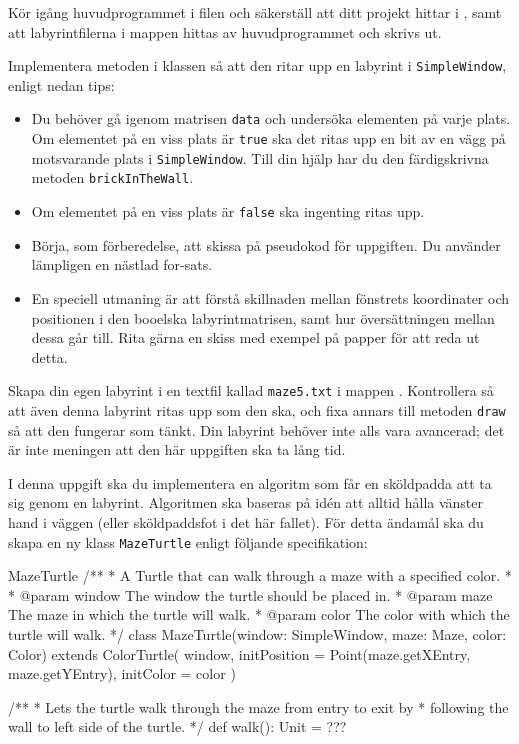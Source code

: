 \Task Kör igång huvudprogrammet i filen  och säkerställ att ditt projekt hittar  i , samt att labyrintfilerna i mappen  hittas av huvudprogrammet och skrivs ut.

\Task Implementera metoden  i klassen  så att den ritar upp en labyrint i \texttt{SimpleWindow}, enligt nedan tips:

\begin{itemize}
\item Du behöver gå igenom matrisen \texttt{data} och undersöka elementen på varje plats. Om elementet på en viss plats är \texttt{true} ska det ritas upp en bit av en vägg på motsvarande plats i \texttt{SimpleWindow}.
Till din hjälp har du den färdigskrivna metoden \texttt{brickInTheWall}.

\item Om elementet på en viss plats är \texttt{false} ska ingenting ritas upp.

\item Börja, som förberedelse, att skissa på pseudokod för uppgiften. Du använder lämpligen en nästlad for-sats.

\item En speciell utmaning är att förstå skillnaden mellan fönstrets koordinater och positionen i den booelska labyrintmatrisen, samt hur översättningen mellan dessa går till. Rita gärna en skiss med exempel på papper för att reda ut detta.
\end{itemize}


\Task Skapa din egen labyrint i en textfil kallad \texttt{maze5.txt} i mappen . Kontrollera så att även denna labyrint ritas upp som den ska, och fixa annars till metoden \texttt{draw} så att den fungerar som tänkt. Din labyrint behöver inte alls vara avancerad; det är inte meningen att den här uppgiften ska ta lång tid.


\Task I denna uppgift ska du implementera en algoritm som får en sköldpadda att ta sig genom en labyrint. Algoritmen ska baseras på idén att alltid hålla vänster hand i väggen (eller sköldpaddsfot i det här fallet). För detta ändamål ska du skapa en ny klass \texttt{MazeTurtle} enligt följande specifikation:

\begin{ScalaSpec}{MazeTurtle}
/**
  * A Turtle that can walk through a maze with a specified color.
  *
  * @param window The window the turtle should be placed in.
  * @param maze   The maze in which the turtle will walk.
  * @param color  The color with which the turtle will walk.
  */
class MazeTurtle(window: SimpleWindow,
                 maze: Maze,
                 color: Color)
  extends ColorTurtle(
    window,
    initPosition = Point(maze.getXEntry, maze.getYEntry),
    initColor = color
  ) {

  /**
    * Lets the turtle walk through the maze from entry to exit by
    * following the wall to left side of the turtle.
    */
  def walk(): Unit = ???

}

\end{ScalaSpec}

